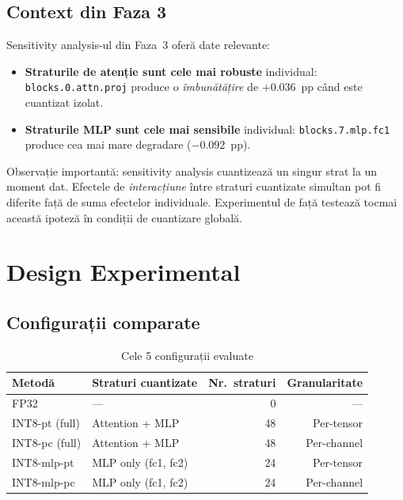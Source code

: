 \documentclass[12pt,a4paper]{article}
\begin{document}
\subsection{Context din Faza 3}

Sensitivity analysis-ul din Faza~3 oferă date relevante:

\begin{itemize}
  \item \textbf{Straturile de atenție sunt cele mai robuste} individual:
    \texttt{blocks.0.attn.proj} produce o \emph{îmbunătățire} de
    $+0.036$~pp când este cuantizat izolat.
  \item \textbf{Straturile MLP sunt cele mai sensibile} individual:
    \texttt{blocks.7.mlp.fc1} produce cea mai mare degradare ($-0.092$~pp).
\end{itemize}

Observație importantă: sensitivity analysis cuantizează un singur strat
la un moment dat. Efectele de \emph{interacțiune} între straturi cuantizate
simultan pot fi diferite față de suma efectelor individuale. Experimentul
de față testează tocmai această ipoteză în condiții de cuantizare globală.

\section{Design Experimental}

\subsection{Configurații comparate}

\begin{table}[H]
  \centering
  \caption{Cele 5 configurații evaluate}
  \begin{tabular}{llrr}
    \toprule
    \textbf{Metodă} & \textbf{Straturi cuantizate} &
    \textbf{Nr.\ straturi} & \textbf{Granularitate} \\
    \midrule
    FP32                & ---                        & 0  & --- \\
    INT8-pt (full)      & Attention + MLP            & 48 & Per-tensor \\
    INT8-pc (full)      & Attention + MLP            & 48 & Per-channel \\
    INT8-mlp-pt         & MLP only (fc1, fc2)        & 24 & Per-tensor \\
    INT8-mlp-pc         & MLP only (fc1, fc2)        & 24 & Per-channel \\
    \bottomrule
  \end{tabular}
  \label{tab:configs}
\end{table}
\end{document}
